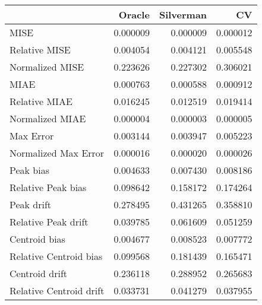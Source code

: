 \begin{tabular}{lrrr}
  \hline
 & Oracle & Silverman & CV \\ 
  \hline
MISE & 0.000009 & 0.000009 & 0.000012 \\ 
  Relative MISE & 0.004054 & 0.004121 & 0.005548 \\ 
  Normalized MISE & 0.223626 & 0.227302 & 0.306021 \\ 
  MIAE & 0.000763 & 0.000588 & 0.000912 \\ 
  Relative MIAE & 0.016245 & 0.012519 & 0.019414 \\ 
  Normalized MIAE & 0.000004 & 0.000003 & 0.000005 \\ 
  Max Error & 0.003144 & 0.003947 & 0.005223 \\ 
  Normalized Max Error & 0.000016 & 0.000020 & 0.000026 \\ 
  Peak bias & 0.004633 & 0.007430 & 0.008186 \\ 
  Relative Peak bias & 0.098642 & 0.158172 & 0.174264 \\ 
  Peak drift & 0.278495 & 0.431265 & 0.358810 \\ 
  Relative Peak drift & 0.039785 & 0.061609 & 0.051259 \\ 
  Centroid bias & 0.004677 & 0.008523 & 0.007772 \\ 
  Relative Centroid bias & 0.099568 & 0.181439 & 0.165471 \\ 
  Centroid drift & 0.236118 & 0.288952 & 0.265683 \\ 
  Relative Centroid drift & 0.033731 & 0.041279 & 0.037955 \\ 
   \hline
\end{tabular}
